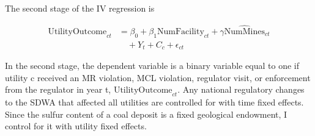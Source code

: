 \documentclass[12pt]{article}
\begin{document}

The second stage of the IV regression is

\begin{equation}\label{2ndstage2sls}
\begin{split}
\text{UtilityOutcome}_{ct} &= \beta_0 + \beta_1\text{NumFacility}_{ct} + \gamma\widehat{\text{NumMines}}_{ct} \\
&\quad + Y_t + C_c + \epsilon_{ct}
\end{split}
\end{equation}

In the second stage, the dependent variable is a binary variable equal to one if utility c received an MR violation, MCL violation, regulator visit, or enforcement from the regulator in year t, $\text{UtilityOutcome}_{ct}$. Any national regulatory changes to the SDWA that affected all utilities are controlled for with time fixed effects. Since the sulfur content of a coal deposit is a fixed geological endowment, I control for it with utility fixed effects. 

\end{document}
